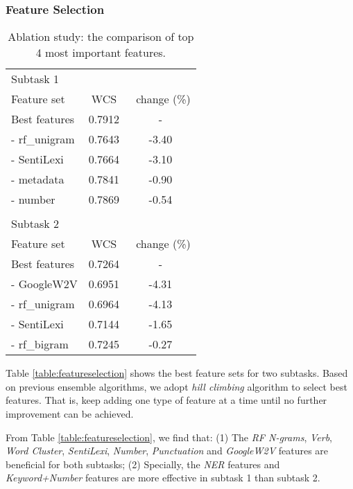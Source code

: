 \documentclass[11pt,a4paper]{article}
\begin{document}
\subsubsection{Feature Selection}
\label{feature}

\begin{table}[!htbp]
\addtolength{\tabcolsep}{5pt}

\begin{tabular}{lcc}

  \hline
  \hline
  Subtask 1 & & \\
  Feature set & WCS & \ change (\%) \\
  \hline
  Best features & 0.7912 & - \\
  - rf\_unigram & 0.7643
 & -3.40 \\
  - SentiLexi & 0.7664 & -3.10 \\
  - metadata & 0.7841 & -0.90 \\
  - number & 0.7869 & -0.54 \\
   \\
  Subtask 2 & & \\
  Feature set & WCS & \ change (\%) \\
  \hline
  Best features & 0.7264 & - \\
  - GoogleW2V & 0.6951 & -4.31 \\
  - rf\_unigram & 0.6964 & -4.13 \\
  - SentiLexi & 0.7144 & -1.65 \\
  - rf\_bigram & 0.7245 & -0.27 \\
  \hline
  \hline
\end{tabular}
\caption{Ablation study: the comparison of top 4 most important features.}
\label{table:ablationstudy}
\end{table}

Table \ref{table:featureselection} shows the best feature sets for two subtasks. Based on previous ensemble algorithms, we adopt \emph{hill climbing} algorithm to select best features. That is, keep adding one type of feature at a time until no further improvement can be achieved.

From Table \ref{table:featureselection}, we find that: (1) The \emph{RF N-grams}, \emph{Verb}, \emph{Word Cluster}, \emph{SentiLexi}, \emph{Number}, \emph{Punctuation} and \emph{GoogleW2V} features are beneficial for both subtasks; (2) Specially, the \emph{NER} features and \emph{Keyword+Number} features are more effective in subtask 1 than subtask 2.
\end{document}
